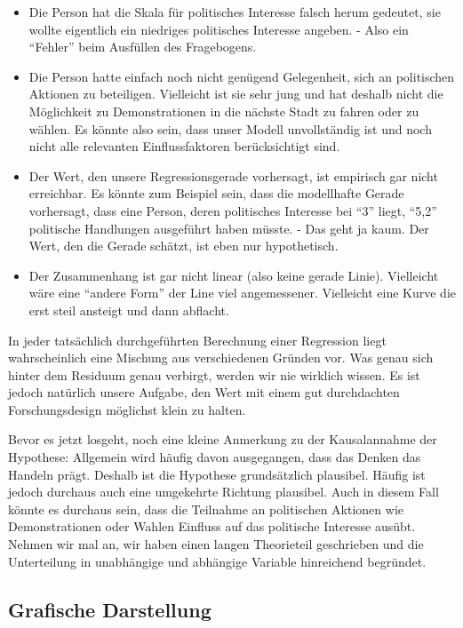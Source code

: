 \documentclass[
]{book}
\begin{document}
\begin{itemize}
\item
  Die Person hat die Skala für politisches Interesse falsch herum gedeutet, sie wollte eigentlich ein niedriges politisches Interesse angeben. - Also ein ``Fehler'' beim Ausfüllen des Fragebogens.
\item
  Die Person hatte einfach noch nicht genügend Gelegenheit, sich an politischen Aktionen zu beteiligen. Vielleicht ist sie sehr jung und hat deshalb nicht die Möglichkeit zu Demonstrationen in die nächste Stadt zu fahren oder zu wählen. Es könnte also sein, dass unser Modell unvollständig ist und noch nicht alle relevanten Einflussfaktoren berücksichtigt sind.
\item
  Der Wert, den unsere Regressionsgerade vorhersagt, ist empirisch gar nicht erreichbar. Es könnte zum Beispiel sein, dass die modellhafte Gerade vorhersagt, dass eine Person, deren politisches Interesse bei ``3'' liegt, ``5,2'' politische Handlungen ausgeführt haben müsste. - Das geht ja kaum. Der Wert, den die Gerade schätzt, ist eben nur hypothetisch.
\item
  Der Zusammenhang ist gar nicht linear (also keine gerade Linie). Vielleicht wäre eine ``andere Form'' der Line viel angemessener. Vielleicht eine Kurve die erst steil ansteigt und dann abflacht.
\end{itemize}

In jeder tatsächlich durchgeführten Berechnung einer Regression liegt wahrscheinlich eine Mischung aus verschiedenen Gründen vor. Was genau sich hinter dem Residuum genau verbirgt, werden wir nie wirklich wissen. Es ist jedoch natürlich unsere Aufgabe, den Wert mit einem gut durchdachten Forschungsdesign möglichst klein zu halten.

Bevor es jetzt losgeht, noch eine kleine Anmerkung zu der Kausalannahme der Hypothese: Allgemein wird häufig davon ausgegangen, dass das Denken das Handeln prägt. Deshalb ist die Hypothese grundsätzlich plausibel. Häufig ist jedoch durchaus auch eine umgekehrte Richtung plausibel. Auch in diesem Fall könnte es durchaus sein, dass die Teilnahme an politischen Aktionen wie Demonstrationen oder Wahlen Einfluss auf das politische Interesse ausübt. Nehmen wir mal an, wir haben einen langen Theorieteil geschrieben und die Unterteilung in unabhängige und abhängige Variable hinreichend begründet.

\hypertarget{grafische-darstellung}{%
\subsection{Grafische Darstellung}\label{grafische-darstellung}}
\end{document}

